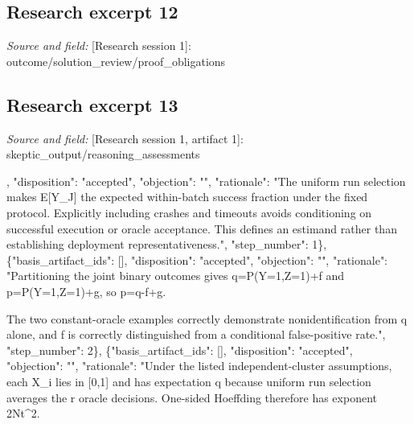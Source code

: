 \documentclass[11pt]{article}
\begin{document}
\subsection{Research excerpt 12}
\textit{Source and field: }[Research session 1]: outcome/solution\_review/proof\_obligations\par
["Analytically discharged within the conditional model, cycle 1, current Investigator reasoning entries 1\textendash{}3: construct indistinguishable histories and establish the sharp minimax error bound.", "Analytically discharged within the conditional model, cycle 1, current Investigator reasoning entry 4: distinguish conditional average error from worst-case error and overall deployment failure.", "Analytically discharged within the conditional model, cycle 1, current Investigator reasoning entries 5\textendash{}6: explain why local rollback is insufficient and why atomic durable same-key deduplication preserves exactly one effect.", "Open: establish that a concrete harness implements the assumed information boundary and transition semantics.", "Open: establish that concrete agent policies and services satisfy the repair assumptions.", "Open: measure controlled agent-level outcomes and establish the applicability limits for deployment and multi-step workflows."]

\subsection{Research excerpt 13}
\textit{Source and field: }[Research session 1, artifact 1]: skeptic\_output/reasoning\_assessments\par
[\{"basis\_artifact\_ids": [], "disposition": "accepted", "objection": "", "rationale": "The uniform run selection makes E[Y\_J] the expected within-batch success fraction under the fixed protocol. Explicitly including crashes and timeouts avoids conditioning on successful execution or oracle acceptance. This defines an estimand rather than establishing deployment representativeness.", "step\_number": 1\}, \{"basis\_artifact\_ids": [], "disposition": "accepted", "objection": "", "rationale": "Partitioning the joint binary outcomes gives q=P(Y=1,Z=1)+f and p=P(Y=1,Z=1)+g, so p=q-f+g.

The two constant-oracle examples correctly demonstrate nonidentification from q alone, and f is correctly distinguished from a conditional false-positive rate.", "step\_number": 2\}, \{"basis\_artifact\_ids": [], "disposition": "accepted", "objection": "", "rationale": "Under the listed independent-cluster assumptions, each X\_i lies in [0,1] and has expectation q because uniform run selection averages the r oracle decisions. One-sided Hoeffding therefore has exponent 2Nt\textasciicircum{}2.
\end{document}
